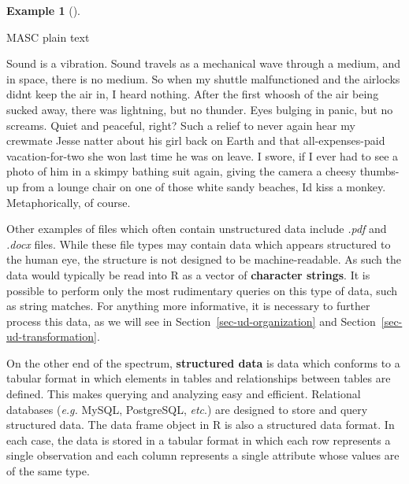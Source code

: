 \documentclass[
  letterpaper,
]{latex/krantz}
\newenvironment{Shaded}{\begin{snugshade}}{\end{snugshade}}
\newcommand{\NormalTok}[1]{\textcolor[rgb]{0.00,0.00,0.00}{#1}}
\theoremstyle{definition}
\newtheorem{example}{Example}[chapter]
\theoremstyle{remark}
\begin{document}
\begin{example}[]\protect\hypertarget{exm-masc-text}{}\label{exm-masc-text}

MASC plain text

\begin{Shaded}
\begin{Highlighting}[]
\NormalTok{Sound is a vibration. Sound travels as a mechanical wave through a medium, and in space, there is no}
\NormalTok{medium. So when my shuttle malfunctioned and the airlocks didn\textquotesingle{}t keep the air in, I heard nothing. After the}
\NormalTok{first whoosh of the air being sucked away, there was lightning, but no thunder. Eyes bulging in}
\NormalTok{panic, but no screams. Quiet and peaceful, right? Such a relief to never again hear my crewmate Jesse natter}
\NormalTok{about his girl back on Earth and that all{-}expenses{-}paid vacation{-}for{-}two she won last time he was on leave. I}
\NormalTok{swore, if I ever had to see a photo of him in a skimpy bathing suit again, giving the camera a cheesy thumbs{-}up}
\NormalTok{from a lounge chair on one of those white sandy beaches, I\textquotesingle{}d kiss a monkey. Metaphorically, of course.}
\end{Highlighting}
\end{Shaded}

\end{example}

Other examples of files which often contain unstructured data include
\emph{.pdf} and \emph{.docx} files. While these file types may contain
data which appears structured to the human eye, the structure is not
designed to be machine-readable. As such the data would typically be
read into R as a vector of \textbf{character strings}. It is possible to
perform only the most rudimentary queries on this type of data, such as
string matches. For anything more informative, it is necessary to
further process this data, as we will see in
Section~\ref{sec-ud-organization} and
Section~\ref{sec-ud-transformation}.

On the other end of the spectrum, \textbf{structured data} is data which
conforms to a tabular format in which elements in tables and
relationships between tables are defined. This makes querying and
analyzing easy and efficient. Relational databases (\emph{e.g.} MySQL,
PostgreSQL, \emph{etc}.) are designed to store and query structured
data. The data frame object in R is also a structured data format. In
each case, the data is stored in a tabular format in which each row
represents a single observation and each column represents a single
attribute whose values are of the same type.
\end{document}
